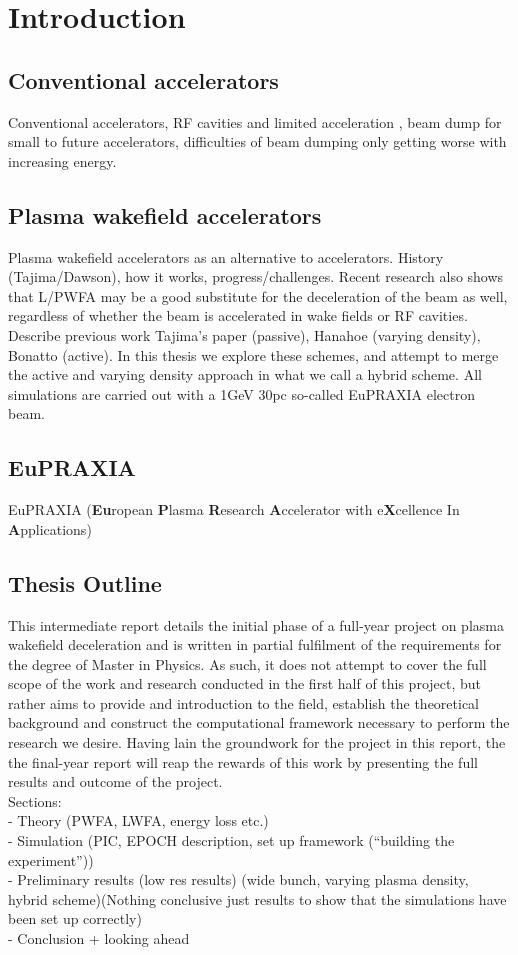 \chapter{Introduction}
\section{Conventional accelerators}
Conventional accelerators, RF cavities and limited acceleration , beam dump for small to future accelerators, difficulties of beam dumping only getting worse with increasing energy. \\
\section{Plasma wakefield accelerators }
Plasma wakefield accelerators as an alternative to accelerators. History (Tajima/Dawson), how it works, progress/challenges. Recent research also shows that L/PWFA may be a good substitute for the deceleration of the beam as well, regardless of whether the beam is accelerated in wake fields or RF cavities. Describe previous work Tajima's paper (passive), Hanahoe (varying density), Bonatto (active). In this thesis we explore these schemes, and attempt to merge the active and varying density approach in what we call a hybrid scheme. All simulations are carried out with a 1GeV 30pc so-called EuPRAXIA electron beam. 
\section{EuPRAXIA}
EuPRAXIA (\textbf{Eu}ropean \textbf{P}lasma \textbf{R}esearch \textbf{A}ccelerator with e\textbf{X}cellence In \textbf{A}pplications)
\section{Thesis Outline}
This intermediate report details the initial phase of a full-year project on plasma wakefield deceleration and is written in partial fulfilment of the requirements for the degree of Master in Physics. As such, it does not attempt to cover the full scope of the work and research conducted in the first half of this project, but rather aims to provide and introduction to the field, establish the theoretical background and construct the computational framework necessary to perform the research we desire. Having lain the groundwork for the project in this report, the the final-year report will reap the rewards of this work by presenting the full results and outcome of the project.\\
Sections:\\
- Theory (PWFA, LWFA, energy loss etc.)\\
- Simulation (PIC, EPOCH description, set up framework (“building the experiment”))\\
- Preliminary results (low res results) (wide bunch, varying plasma density, hybrid scheme)(Nothing conclusive just results to show that the simulations have been set up correctly)\\
- Conclusion + looking ahead\\

